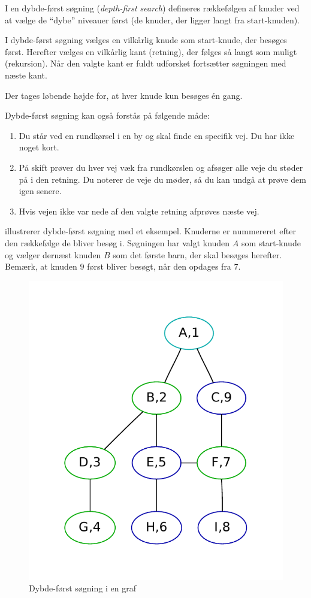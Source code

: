 \documentclass[10pt,a4paper,danish]{article}
\begin{document}
I en dybde-først søgning (\textit{depth-first search}) defineres
rækkefølgen af knuder ved at vælge de "`dybe"' niveauer først (de knuder,
der ligger langt fra start-knuden).

I dybde-først søgning vælges en vilkårlig knude som start-knude, der
besøges først. Herefter vælges en vilkårlig kant (retning), der følges
så langt som muligt (rekursion). Når den valgte kant er fuldt
udforsket fortsætter søgningen med næste kant.

Der tages løbende højde for, at hver knude kun besøges \'en gang.

Dybde-først søgning kan også forstås på følgende måde:
\begin{enumerate}
\item Du står ved en rundkørsel i en by og skal finde en specifik
  vej. Du har ikke noget kort.
\item På skift prøver du hver vej væk fra rundkørslen og afsøger
  alle veje du støder på i den retning. Du noterer de veje du møder,
  så du kan undgå at prøve dem igen senere.
\item Hvis vejen ikke var nede af den valgte retning afprøves næste vej.
\end{enumerate}


 illustrerer dybde-først søgning med et
eksempel. Knuderne er nummereret efter den rækkefølge de bliver besøg
i. Søgningen har valgt knuden $A$ som start-knude og vælger dernæst
knuden $B$ som det første barn, der skal besøges herefter. Bemærk, at
knuden $9$ først bliver besøgt, når den opdages fra $7$.




\begin{figure}[h]\centering
\includegraphics[width=.6\textwidth]{graphs/depth-first.pdf}
\caption{Dybde-først søgning i en graf}
\label{fig:depth-first}
\end{figure}
\end{document}
